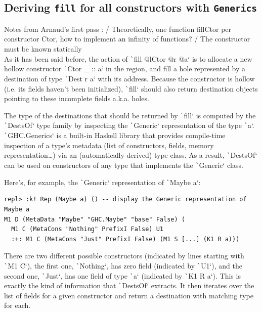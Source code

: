 \documentclass[english]{jflart}
\newcommand{\TODO}[1]{{\color{red}\large #1}}
\begin{document}
\subsection{Deriving \texttt{fill} for all constructors with \texttt{Generics}}

\TODO{Notes from Arnaud's first pass : / Theoretically, one function fillCtor per constructor Ctor, how to implement an infinity of functions? / The constructor must be known statically}\\

As it has been said before, the action of \texttt`fill @lCtor @r @a` is to allocate a new hollow constructor \texttt`Ctor _ :: a` in the region, and fill a hole represented by a destination of type \texttt`Dest r a` with its address. Because the constructor is hollow (i.e. its fields haven't been initialized), \texttt`fill` should also return destination objects pointing to these incomplete fields a.k.a. holes.

The type of the destinations that should be returned by \texttt`fill` is computed by the \texttt`DestsOf` type family by inspecting the \texttt`Generic` representation of the type \texttt`a`. \texttt`GHC.Generics` is a built-in Haskell library that provides compile-time inspection of a type's metadata (list of constructors, fields, memory representation\ldots) via an (automatically derived) type class. As a result, \texttt`DestsOf` can be used on constructors of any type that implements the \texttt`Generic` class.

Here's, for example, the \texttt`Generic` representation of \texttt`Maybe a`:

{\small
\begin{verbatim}
repl> :k! Rep (Maybe a) () -- display the Generic representation of Maybe a
M1 D (MetaData "Maybe" "GHC.Maybe" "base" False) (
  M1 C (MetaCons "Nothing" PrefixI False) U1
  :+: M1 C (MetaCons "Just" PrefixI False) (M1 S [...] (K1 R a)))
\end{verbatim}
}

There are two different possible constructors (indicated by lines starting with \texttt`M1 C`), the first one, \texttt`Nothing`, has zero field (indicated by \texttt`U1`), and the second one, \texttt`Just`, has one field of type \texttt`a` (indicated by \texttt`K1 R a`). This is exactly the kind of information that \texttt`DestsOf` extracts. It then iterates over the list of fields for a given constructor and return a destination with matching type for each.
\end{document}
